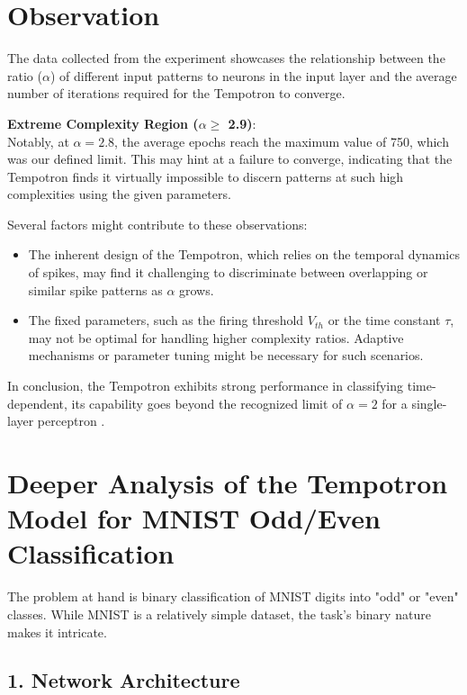 \section{Observation}

The data collected from the experiment showcases the relationship between the ratio (\( \alpha \)) of different input patterns to neurons in the input layer and the average number of iterations required for the Tempotron to converge.

\textbf{Extreme Complexity Region (\( \alpha \geq\) 2.9)}: \\
Notably, at \( \alpha = 2.8 \), the average epochs reach the maximum value of 750, which was our defined limit. This may hint at a failure to converge, indicating that the Tempotron finds it virtually impossible to discern patterns at such high complexities using the given parameters.

Several factors might contribute to these observations:

\begin{itemize}
    \item The inherent design of the Tempotron, which relies on the temporal dynamics of spikes, may find it challenging to discriminate between overlapping or similar spike patterns as \( \alpha \) grows.
    
    \item The fixed parameters, such as the firing threshold \( V_{th} \) or the time constant \( \tau \), may not be optimal for handling higher complexity ratios. Adaptive mechanisms or parameter tuning might be necessary for such scenarios.
    
\end{itemize}

In conclusion, the Tempotron exhibits strong performance in classifying time-dependent, its capability goes beyond the recognized limit of \( \alpha = 2 \) for a single-layer perceptron \cite{gutig2006tempotron}.


\section*{Deeper Analysis of the Tempotron Model for MNIST Odd/Even Classification}

The problem at hand is binary classification of MNIST digits into "odd" or "even" classes. While MNIST is a relatively simple dataset, the task's binary nature makes it intricate.

\subsection*{1. Network Architecture}

